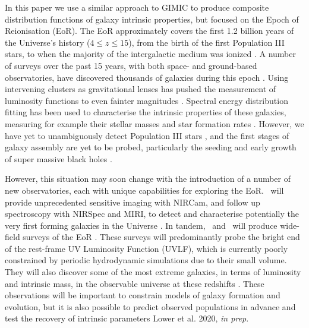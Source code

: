 In this paper we use a similar approach to GIMIC to produce composite distribution functions of galaxy intrinsic properties, but focused on the Epoch of Reionisation (EoR).
The EoR approximately covers the first 1.2 billion years of the Universe's history ($4 \leqslant z \leqslant 15$), from the birth of the first Population III stars, to when the majority of the intergalactic medium was ionized \citep{bromm_first_2011,zaroubi_epoch_2013,stark_galaxies_2016,cooray_cosmic_2019}.
A number of surveys over the past 15 years, with both space- and ground-based observatories, have discovered thousands of galaxies during this epoch \citep{beckwith_hubble_2006,warren_united_2007,wilkins_new_2011,koekemoer_candels_2011,grogin_candels:_2011,mccracken_ultravista:_2012,bouwens_uv_2015}.
Using intervening clusters as gravitational lenses has pushed the measurement of luminosity functions to even fainter magnitudes \citep{castellano_constraints_2016,livermore_directly_2017,atek_extreme_2018,ishigaki_full-data_2018}.
Spectral energy distribution fitting has been used to characterise the intrinsic properties of these galaxies, measuring for example their stellar masses \citep[\textit{e.g.}][]{gonzalez_evolution_2011,duncan_mass_2014,song_evolution_2016,stefanon_rest-frame_2017} and star formation rates \citep[\textit{e.g.}][]{smit_star_2012,katsianis_evolution_2017}.
However, we have yet to unambiguously detect Population III stars \citep{yoshida_formation_2019}, and the first stages of galaxy assembly are yet to be probed, particularly the seeding and early growth of super massive black holes \citep{smith_first_2017}.

However, this situation may soon change with the introduction of a number of new observatories, each with unique capabilities for exploring the EoR.
\jwst\ will provide unprecedented sensitive imaging with NIRCam, and follow up spectroscopy with NIRSpec and MIRI, to detect and characterise potentially the very first forming galaxies in the Universe \citep{gardner_james_2006}.
In tandem, \wfirst\ and \euclid\ will produce wide-field surveys of the EoR \citep{spergel_wide-field_2015,laureijs_euclid_2011}.
These surveys will predominantly probe the bright end of the rest-frame UV Luminosity Function (UVLF), which is currently poorly constrained by periodic hydrodynamic simulations due to their small volume.
They will also discover some of the most extreme galaxies, in terms of luminosity and intrinsic mass, in the observable universe at these redshifts \citep{behroozi_most_2018}.
These observations will be important to constrain models of galaxy formation and evolution, but it is also possible to predict observed populations in advance and test the recovery of intrinsic parameters \citep{pforr_recovering_2012,pforr_recovering_2013,smith_deriving_2015} Lower et al. 2020, \textit{in prep}.

